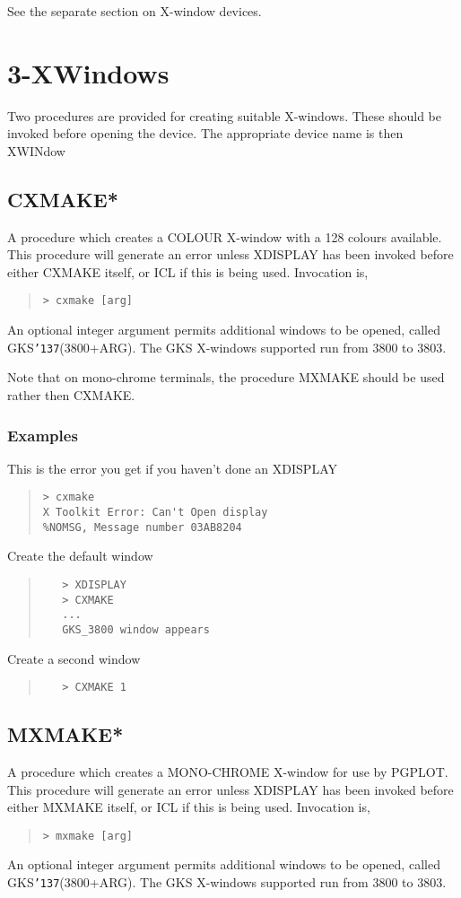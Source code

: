 \documentclass{book}
\renewcommand{\_}{{\tt\char'137}}     %
\begin{document}
See the separate section on X-window devices.

\section{3-XWindows}
Two procedures are provided for creating suitable X-windows. These
should be invoked before opening the device. The appropriate device
name is then XWINdow

\subsection{CXMAKE*}
A procedure which creates a COLOUR X-window with a 128 colours
available. This procedure will generate an error unless XDISPLAY
has been invoked before either CXMAKE itself, or ICL if this is
being used. Invocation is,
\begin{quote}\begin{verbatim}
> cxmake [arg]
\end{verbatim}\end{quote}
An optional integer argument permits additional windows to be
opened, called GKS\_(3800+ARG). The GKS X-windows supported run
from 3800 to 3803.

Note that on mono-chrome terminals, the procedure MXMAKE should
be used rather then CXMAKE.

\subsubsection{Examples}
This is the error you get if you haven't done an XDISPLAY
\begin{quote}\begin{verbatim}
> cxmake
X Toolkit Error: Can't Open display
%NOMSG, Message number 03AB8204
\end{verbatim}\end{quote}
Create the default window
\begin{quote}\begin{verbatim}
   > XDISPLAY
   > CXMAKE
   ...
   GKS_3800 window appears
\end{verbatim}\end{quote}
Create a second window
\begin{quote}\begin{verbatim}
   > CXMAKE 1
\end{verbatim}\end{quote}
\subsection{MXMAKE*}
A procedure which creates a MONO-CHROME X-window for use by PGPLOT.
This procedure will generate an error unless XDISPLAY has been
invoked before either MXMAKE itself, or ICL if this is being used.
Invocation is,
\begin{quote}\begin{verbatim}
> mxmake [arg]
\end{verbatim}\end{quote}
An optional integer argument permits additional windows to be
opened, called GKS\_(3800+ARG). The GKS X-windows supported run
from 3800 to 3803.
\end{document}
